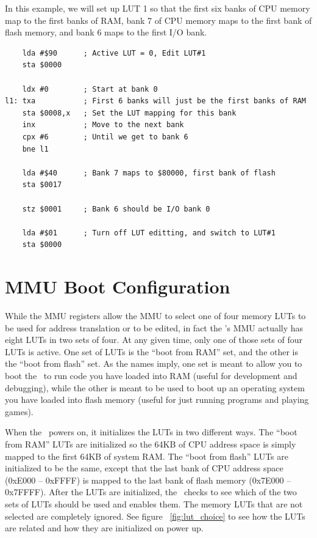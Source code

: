 In this example, we will set up LUT 1 so that the first six banks of CPU memory map to the first banks of RAM, bank 7 of CPU memory maps to the first bank of flash memory, and bank 6 maps to the first I/O bank.

\begin{verbatim}
    lda #$90      ; Active LUT = 0, Edit LUT#1
    sta $0000

    ldx #0        ; Start at bank 0
l1: txa           ; First 6 banks will just be the first banks of RAM
    sta $0008,x   ; Set the LUT mapping for this bank
    inx           ; Move to the next bank
    cpx #6        ; Until we get to bank 6
    bne l1

    lda #$40      ; Bank 7 maps to $80000, first bank of flash
    sta $0017

    stz $0001     ; Bank 6 should be I/O bank 0

    lda #$01      ; Turn off LUT editting, and switch to LUT#1
    sta $0000
\end{verbatim}

\section*{MMU Boot Configuration}

While the MMU registers allow the MMU to select one of four memory LUTs to be used for address translation or to be edited, in fact the \jr's MMU actually has eight LUTs in two sets of four. At any given time, only one of those sets of four LUTs is active. One set of LUTs is the ``boot from RAM'' set, and the other is the ``boot from flash'' set. As the names imply, one set is meant to allow you to boot the \jr\ to run code you have loaded into RAM (useful for development and debugging), while the other is meant to be used to boot up an operating system you have loaded into flash memory (useful for just running programs and playing games).

When the \jr\ powers on, it initializes the LUTs in two different ways. The ``boot from RAM'' LUTs are initialized so the 64KB of CPU address space is simply mapped to the first 64KB of system RAM. The ``boot from flash'' LUTs are initialized to be the same, except that the last bank of CPU address space (0xE000 -- 0xFFFF) is mapped to the last bank of flash memory (0x7E000 -- 0x7FFFF). After the LUTs are initialized, the \jr\ checks to see which of the two sets of LUTs should be used and enables them. The memory LUTs that are not selected are completely ignored. See figure ~\ref{fig:lut_choice} to see how the LUTs are related and how they are initialized on power up.

